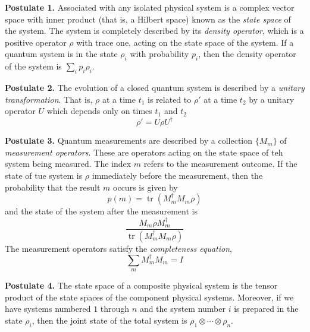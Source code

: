 \begin{mdframed}
    \textbf{Postulate 1.} Associated with any isolated physical system is a complex vector space with inner product (that is, a Hilbert space) known as the \textit{state space} of the system. The system is completely described by its \textit{density operator}, which is a positive operator $\rho$ with trace one, acting on the state space of the system. If a quantum system is in the state $\rho_i$ with probability $p_i$, then the density operator of the system is $\sum_i p_i\rho_i$.

    \bigskip 

    \noindent\textbf{Postulate 2.} The evolution of a closed quantum system is described by a \textit{unitary transformation}. That is, $\rho$ at a time $t_1$ is related to $\rho'$ at a time $t_2$ by a unitary operator $U$ which depends only on times $t_1$ and $t_2$
    \begin{equation*}
        \rho' = U\rho U^\dagger
    \end{equation*}

    \bigskip

    \noindent\textbf{Postulate 3.} Quantum measurements are described by a collection $\{M_m\}$ of \textit{measurement operators}. These are operators acting on the state space of teh system being measured. The index $m$ refers to the measurement outcome. If the state of tue system is $\rho$ immediately before the measurement, then the probability that the result $m$ occurs is given by 
    \begin{equation*}
        p(m) = \operatorname{tr}(M_m^\dagger M_m\rho)
    \end{equation*}
    and the state of the system after the measurement is 
    \begin{equation*}
        \frac{M_m\rho M_m^\dagger}{\operatorname{tr}(M_m^\dagger M_m\rho)}
    \end{equation*}
    The measurement operators satisfy the \textit{completeness equation},
    \begin{equation*}
        \sum_m M_m^\dagger M_m = I
    \end{equation*}

    \bigskip

    \noindent\textbf{Postulate 4.} The state space of a composite physical system is the tensor product of the state spaces of the component physical systems. Moreover, if we have systems numbered $1$ through $n$ and the system number $i$ is prepared in the state $\rho_i$, then the joint state of the total system is $\rho_1\otimes\cdots\otimes\rho_n$.
\end{mdframed}


